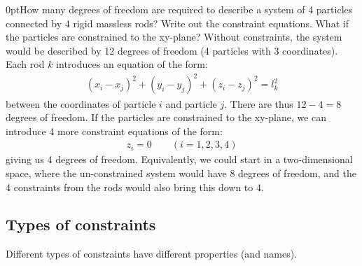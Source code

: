 \begin{example}{0pt}{How many degrees of freedom are required to describe a system of 4 particles connected by 4 rigid massless rods? Write out the constraint equations. What if the particles are constrained to the xy-plane? }{}
Without constraints, the system would be described by 12 degrees of freedom (4 particles with 3 coordinates). Each rod $k$ introduces an equation of the form:
\begin{align*}
(x_i-x_j)^2+(y_i-y_j)^2+(z_i-z_j)^2=l_k^2
\end{align*}
between the coordinates of particle $i$ and particle $j$. There are thus $12-4=8$ degrees of freedom. If the particles are constrained to the xy-plane, we can introduce 4 more constraint equations of the form:
\begin{align*}
z_i=0\qquad (i=1,2,3,4)
\end{align*}
giving us 4 degrees of freedom. Equivalently, we could start in a two-dimensional space, where the un-constrained system would have 8 degrees of freedom, and the 4 constraints from the rods would also bring this down to 4.
\label{ex:4MassesAndRod}
\end{example}

\subsection{Types of constraints}
Different types of constraints have different properties (and names). 
